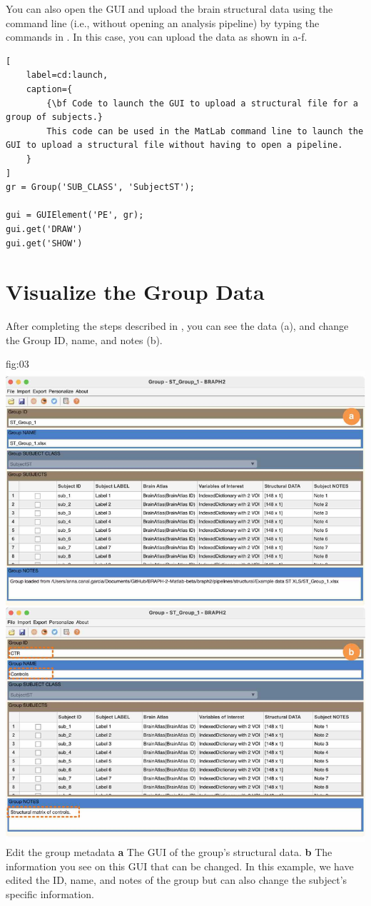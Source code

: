 \documentclass[justified]{tufte-handout}
\begin{document}
\begin{tcolorbox}[
	title=GUI launch from command line
]
You can also open the GUI and upload the brain structural data using the command line (i.e., without opening an analysis pipeline) by typing the commands in . In this case, you can upload the data as shown in a-f.

\begin{lstlisting}[
	label=cd:launch,
	caption={
		{\bf Code to launch the GUI to upload a structural file for a group of subjects.}
		This code can be used in the MatLab command line to launch the GUI to upload a structural file without having to open a pipeline.
	}
]
gr = Group('SUB_CLASS', 'SubjectST');

gui = GUIElement('PE', gr);
gui.get('DRAW')
gui.get('SHOW')
\end{lstlisting}
\end{tcolorbox}

\section{Visualize the Group Data}

After completing the steps described in , you can see the data (a), and change the Group ID, name, and notes (b). 

	{fig:03}
	{
	\includegraphics{fig03.jpg}
	}
	{Edit the group metadata}
	{ 
	{\bf a} The GUI of the group's structural data. 
	{\bf b} The information you see on this GUI that can be changed. In this example, we have edited the ID, name, and notes of the group but can also change the subject's specific information.
	}
\end{document}
